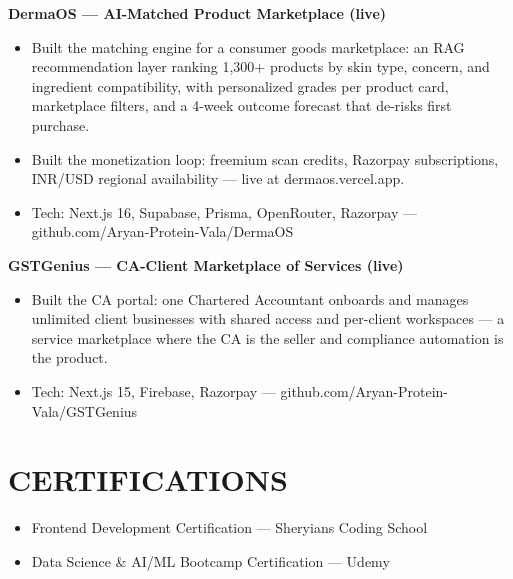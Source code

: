 \documentclass[9pt]{article}
\begin{document}
\textbf{DermaOS  ---  AI-Matched Product Marketplace (live)}
\vspace{1pt}
\begin{itemize}[leftmargin=11pt,itemsep=0pt,topsep=1pt,parsep=0pt]
\item Built the matching engine for a consumer goods marketplace: an RAG recommendation layer ranking 1,300+ products by skin type, concern, and ingredient compatibility, with personalized grades per product card, marketplace filters, and a 4-week outcome forecast that de-risks first purchase.
\item Built the monetization loop: freemium scan credits, Razorpay subscriptions, INR/USD regional availability  ---  live at dermaos.vercel.app.
\item Tech: Next.js 16, Supabase, Prisma, OpenRouter, Razorpay  ---  github.com/Aryan-Protein-Vala/DermaOS
\end{itemize}
\textbf{GSTGenius  ---  CA-Client Marketplace of Services (live)}
\vspace{1pt}
\begin{itemize}[leftmargin=11pt,itemsep=0pt,topsep=1pt,parsep=0pt]
\item Built the CA portal: one Chartered Accountant onboards and manages unlimited client businesses with shared access and per-client workspaces  ---  a service marketplace where the CA is the seller and compliance automation is the product.
\item Tech: Next.js 15, Firebase, Razorpay  ---  github.com/Aryan-Protein-Vala/GSTGenius
\end{itemize}
\section*{CERTIFICATIONS}
\begin{itemize}[leftmargin=11pt,itemsep=0pt,topsep=1pt,parsep=0pt]
\item Frontend Development Certification  ---  Sheryians Coding School
\item Data Science \& AI/ML Bootcamp Certification  ---  Udemy
\end{itemize}
\end{document}
